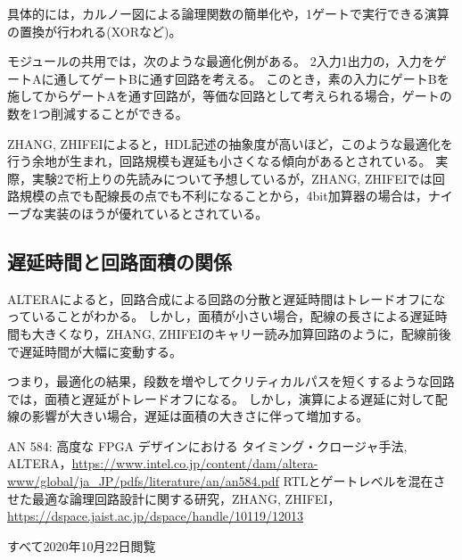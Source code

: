 \documentclass[a4paper,15pt]{jsarticle}
\begin{document}
具体的には，カルノー図による論理関数の簡単化や，1ゲートで実行できる演算の置換が行われる(XORなど)。

モジュールの共用では，次のような最適化例がある。
2入力1出力の，入力をゲートAに通してゲートBに通す回路を考える。
このとき，素の入力にゲートBを施してからゲートAを通す回路が，等価な回路として考えられる場合，ゲートの数を1つ削減することができる。

ZHANG, ZHIFEI\cite{RTL}によると，HDL記述の抽象度が高いほど，このような最適化を行う余地が生まれ，回路規模も遅延も小さくなる傾向があるとされている。
実際，実験2で桁上りの先読みについて予想しているが，ZHANG, ZHIFEI\cite{RTL}では回路規模の点でも配線長の点でも不利になることから，4bit加算器の場合は，ナイーブな実装のほうが優れているとされている。

\subsection{遅延時間と回路面積の関係}
ALTERA\cite{ALTERA}によると，回路合成による回路の分散と遅延時間はトレードオフになっていることがわかる。
しかし，面積が小さい場合，配線の長さによる遅延時間も大きくなり，ZHANG, ZHIFEI\cite{RTL}のキャリー読み加算回路のように，配線前後で遅延時間が大幅に変動する。

つまり，最適化の結果，段数を増やしてクリティカルパスを短くするような回路では，面積と遅延がトレードオフになる。
しかし，演算による遅延に対して配線の影響が大きい場合，遅延は面積の大きさに伴って増加する。

\begin{thebibliography}{99}
  AN 584: 高度な FPGA デザインにおける  タイミング・クロージャ手法, ALTERA，\url{https://www.intel.co.jp/content/dam/altera-www/global/ja_JP/pdfs/literature/an/an584.pdf}
   RTLとゲートレベルを混在させた最適な論理回路設計に関する研究，ZHANG, ZHIFEI，\url{https://dspace.jaist.ac.jp/dspace/handle/10119/12013}
\end{thebibliography}
すべて2020年10月22日閲覧
\end{document}
